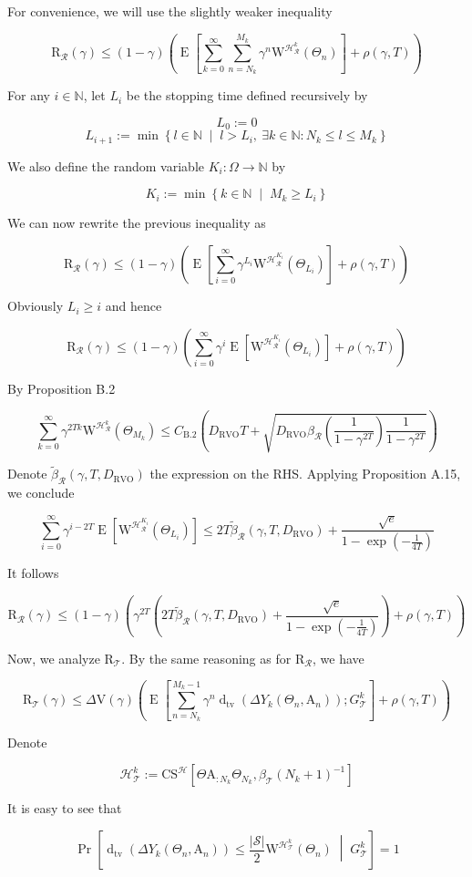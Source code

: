 \documentclass[a4paper]{article}
\newcommand{\AP}[1]{\left(#1\right)}
\newcommand{\AB}[1]{\left[#1\right]}
\newcommand{\ABM}[2]{\left[#1\;\middle\vert\;#2\right]}
\newcommand{\ACM}[2]{\left\{#1\;\middle\vert\;#2\right\}}
\newcommand{\Abs}[1]{\left\vert #1 \right\vert}
\newcommand{\CPb}[2]{\operatorname{Pr}\ABM{#1}{#2}}
\newcommand{\E}[1]{\operatorname{E}\AB{#1}}
\newcommand{\Dtva}[1]{\operatorname{d}_{\text{tv}}\AP{#1}}
\newcommand{\Nats}{\mathbb{N}}
\newcommand{\St}{\mathcal{S}}
\newcommand{\R}{\mathcal{R}}
\newcommand{\T}{\mathcal{T}}
\newcommand{\Hy}{\mathcal{H}}
\newcommand{\DRVO}{D_{\mathrm{RVO}}}
\newcommand{\V}{\mathrm{V}}
\newcommand{\Reg}{\mathrm{R}}
\newcommand{\SHy}{Y}
\newcommand{\AT}{\mathrm{A}}
\newcommand{\ET}{N}
\newcommand{\IT}{M}
\newcommand{\CSE}{G}
\newcommand{\CS}{\mathrm{CS}}
\newcommand{\W}{\mathrm{W}}
\begin{document}
For convenience, we will use the slightly weaker inequality

$$\Reg_\R(\gamma)\leq(1-\gamma)\AP{\E{\sum_{k=0}^\infty\sum_{n=\ET_k}^{\IT_k}\gamma^{n}\W^{\Hy_\R^k}\AP{\Theta_n}}+\rho(\gamma,T)}$$

For any $i\in\Nats$, let $L_i$ be the stopping time defined recursively by

$$L_0:=0$$
$$L_{i+1}:=\min\ACM{l\in\Nats}{l>L_i,\ \exists k\in\Nats:\ET_k\leq l \leq \IT_k}$$

We also define the random variable $K_i:\Omega\rightarrow\Nats$ by

$$K_i:=\min\ACM{k\in\Nats}{\IT_k\geq L_i}$$

We can now rewrite the previous inequality as

$$\Reg_\R(\gamma)\leq(1-\gamma)\AP{\E{\sum_{i=0}^\infty\gamma^{L_i}\W^{\Hy_\R^{K_i}}\AP{\Theta_{L_i}}}+\rho(\gamma,T)}$$

Obviously $L_i\geq i$ and hence

$$\Reg_\R(\gamma)\leq(1-\gamma)\AP{\sum_{i=0}^\infty\gamma^{i}\E{\W^{\Hy_\R^{K_i}}\AP{\Theta_{L_i}}}+\rho(\gamma,T)}$$

By Proposition B.2

$$\sum_{k=0}^\infty\gamma^{2Tk}\W^{\Hy_\R^{k}}\AP{\Theta_{M_k}}\leq C_{\text{B.2}}\AP{\DRVO T+\sqrt{\DRVO\beta_\R\AP{\frac{1}{1-\gamma^{2T}}}\frac{1}{1-\gamma^{2T}}}}$$

Denote $\tilde{\beta}_\R(\gamma,T,\DRVO)$ the expression on the RHS. Applying Proposition A.15, we conclude

$$\sum_{i=0}^\infty\gamma^{i-2T}\E{\W^{\Hy_\R^{K_i}}\AP{\Theta_{L_i}}}\leq 2T\tilde{\beta}_\R(\gamma,T,\DRVO)+\frac{\sqrt{e}}{1-\exp\AP{-\frac{1}{4T}}}$$

It follows

$$\Reg_\R(\gamma)\leq(1-\gamma)\AP{\gamma^{2T}\AP{2T\tilde{\beta}_\R(\gamma,T,\DRVO)+\frac{\sqrt{e}}{1-\exp\AP{-\frac{1}{4T}}}}+\rho(\gamma,T)}$$

Now, we analyze $\Reg_{\T}$. By the same reasoning as for $\Reg_\R$, we have

$$\Reg_\T(\gamma)\leq\Delta\V(\gamma)\AP{\E{\sum_{n=\ET_k}^{\IT_k-1}\gamma^{n}\Dtva{\Delta\SHy_k\AP{\Theta_n,\AT_n}};\CSE_\T^k}+\rho(\gamma,T)}$$

Denote

$$\Hy_\T^k:=\CS^\Hy\AB{\Theta\AT_{:N_k}\Theta_{N_k},\beta_\T\AP{N_k+1}^{-1}}$$

It is easy to see that

$$\CPb{\Dtva{\Delta\SHy_k\AP{\Theta_n,\AT_n}}\leq\frac{\Abs{\St}}{2}\W^{\Hy_\T^k}\AP{\Theta_n}}{\CSE_\T^k}=1$$
\end{document}
